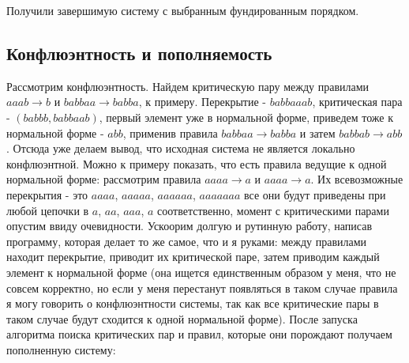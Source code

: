 \documentclass{article}
\begin{document}
Получили завершимую систему с выбранным фундированным порядком.

\subsection*{Конфлюэнтность и пополняемость}

Рассмотрим конфлюэнтность.
Найдем критическую пару между правилами $aaab \rightarrow b$ и $babbaa \rightarrow babba$, к примеру. Перекрытие - $babbaaab$, критическая пара - $(babbb, babbaab)$, первый элемент уже в нормальной форме, приведем тоже к нормальной форме - $abb$, применив правила $babbaa \rightarrow babba$ и затем $babbab \rightarrow abb$. Отсюда уже делаем вывод, что исходная система не является локально конфлюэнтной. Можно к примеру показать, что есть правила ведущие к одной нормальной форме: рассмотрим правила $aaaa \rightarrow a$ и $aaaa \rightarrow a$. Их всевозможные перекрытия - это $aaaa$, $aaaaa$, $aaaaaa$, $aaaaaaa$ все они будут приведены при любой цепочки в $a$, $aa$, $aaa$, $a$ соответственно, момент с критическими парами опустим ввиду очевидности. Ускоорим долгую и рутинную работу, написав программу, которая делает то же самое, что и я руками: между правилами находит перекрытие, приводит их критической паре, затем приводим каждый элемент к нормальной форме (она ищется единственным образом у меня, что не совсем корректно, но если у меня перестанут появляться в таком случае правила я могу говорить о конфлюэнтности системы, так как все критические пары в таком случае будут сходится к одной нормальной форме). После запуска алгоритма поиска критических пар и правил, которые они порождают получаем пополненную систему:
\end{document}
